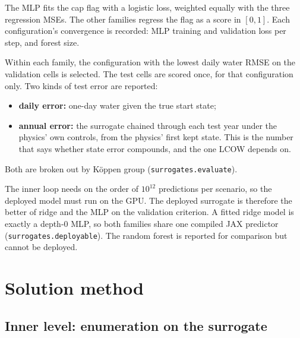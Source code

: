 \documentclass[11pt]{article}
\newcommand{\code}[1]{\texttt{#1}}
\begin{document}
The MLP fits the cap flag with a logistic loss, weighted equally with the three regression
MSEs. The other families regress the flag as a score in $[0,1]$. Each configuration's
convergence is recorded: MLP training and validation loss per step, and forest size.

Within each family, the configuration with the lowest daily water RMSE on the validation cells
is selected. The test cells are scored once, for that configuration only. Two kinds of test
error are reported:
\begin{itemize}
\item \textbf{daily error:} one-day water given the true start state;
\item \textbf{annual error:} the surrogate chained through each test year under the physics'
own controls, from the physics' first kept state. This is the number that says whether state
error compounds, and the one LCOW depends on.
\end{itemize}
Both are broken out by K\"oppen group (\code{surrogates.evaluate}).

The inner loop needs on the order of $10^{12}$ predictions per scenario, so the deployed model
must run on the GPU. The deployed surrogate is therefore the better of ridge and the MLP on the
validation criterion. A fitted ridge model is exactly a depth-0 MLP, so both families share
one compiled JAX predictor (\code{surrogates.deployable}). The random forest is reported for
comparison but cannot be deployed.

\section{Solution method}

\subsection{Inner level: enumeration on the surrogate}
\end{document}
